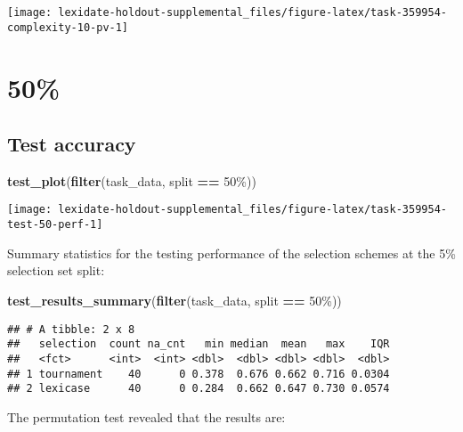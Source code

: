 \documentclass[
]{book}
\newenvironment{Shaded}{\begin{snugshade}}{\end{snugshade}}
\newcommand{\FunctionTok}[1]{\textcolor[rgb]{0.13,0.29,0.53}{\textbf{#1}}}
\newcommand{\NormalTok}[1]{#1}
\newcommand{\SpecialCharTok}[1]{\textcolor[rgb]{0.81,0.36,0.00}{\textbf{#1}}}
\newcommand{\StringTok}[1]{\textcolor[rgb]{0.31,0.60,0.02}{#1}}
\begin{document}
\texttt{[image: lexidate-holdout-supplemental\_files/figure-latex/task-359954-complexity-10-pv-1]}

\hypertarget{section-7}{%
\section{50\%}\label{section-7}}

\hypertarget{test-accuracy-7}{%
\subsection{Test accuracy}\label{test-accuracy-7}}

\begin{Shaded}
\begin{Highlighting}[]
\FunctionTok{test\_plot}\NormalTok{(}\FunctionTok{filter}\NormalTok{(task\_data, split }\SpecialCharTok{==} \StringTok{\textquotesingle{}50\%\textquotesingle{}}\NormalTok{))}
\end{Highlighting}
\end{Shaded}

\texttt{[image: lexidate-holdout-supplemental\_files/figure-latex/task-359954-test-50-perf-1]}

Summary statistics for the testing performance of the selection schemes at the 5\% selection set split:

\begin{Shaded}
\begin{Highlighting}[]
\FunctionTok{test\_results\_summary}\NormalTok{(}\FunctionTok{filter}\NormalTok{(task\_data, split }\SpecialCharTok{==} \StringTok{\textquotesingle{}50\%\textquotesingle{}}\NormalTok{))}
\end{Highlighting}
\end{Shaded}

\begin{verbatim}
## # A tibble: 2 x 8
##   selection  count na_cnt   min median  mean   max    IQR
##   <fct>      <int>  <int> <dbl>  <dbl> <dbl> <dbl>  <dbl>
## 1 tournament    40      0 0.378  0.676 0.662 0.716 0.0304
## 2 lexicase      40      0 0.284  0.662 0.647 0.730 0.0574
\end{verbatim}

The permutation test revealed that the results are:
\end{document}
